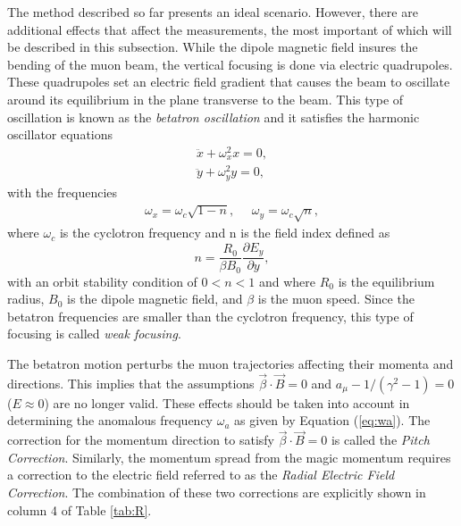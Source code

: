 \documentclass{outhesis}
\begin{document}
The method described so far presents an ideal scenario. However, there are additional effects that affect the measurements, the most important of which will be described in this subsection.  
While the dipole magnetic field insures the bending of the muon beam, the vertical focusing is done via electric quadrupoles. These quadrupoles set an electric field gradient that causes the beam to oscillate around its equilibrium in the plane transverse to the beam. This type of oscillation is known as the \emph{betatron oscillation} and it satisfies the harmonic oscillator equations 
\begin{equation}
\begin{split}
\ddot{x} + \omega_x^2 x = 0, \\
\ddot{y} + \omega_y^2 y = 0,
\end{split}
\end{equation}
with the frequencies 
\begin{equation}
\begin{split}
\omega_x = \omega_c\sqrt{1-n}, \,\,\,\,\,\,\,\,
\omega_y = \omega_c\sqrt{n},
\end{split}
\end{equation}
where $ \omega_c$ is the cyclotron frequency and n is the field index defined as 
\begin{equation}
n = \frac{R_0}{\beta B_0}\frac{\partial E_y}{\partial y},
\end{equation}
with an orbit stability condition of $0<n<1$ and where $R_0$ is the equilibrium radius, $B_0$ is the dipole magnetic field, and $\beta$ is the muon speed. Since the betatron frequencies are smaller than the cyclotron frequency, this type of focusing is called \emph{weak focusing}.
 
The betatron motion perturbs the muon trajectories affecting their momenta and directions. This implies that the assumptions $\overrightarrow{\beta} \cdot \overrightarrow{B} = 0$ and $a_{\mu} -1/\left(\gamma^2-1\right) = 0$ ($E \approx 0$) are no longer valid. These effects should be taken into account in determining the anomalous frequency $\omega_a$ as given by Equation (\ref{eq:wa}). The correction for the momentum direction to satisfy $\overrightarrow{\beta} \cdot \overrightarrow{B} = 0$ is called the \emph{Pitch Correction}. Similarly, the momentum spread from the magic momentum requires a correction to the electric field referred to as the \emph{Radial Electric Field Correction}. The combination of these two corrections are explicitly shown in column 4 of Table \ref{tab:R}. 
\end{document}
